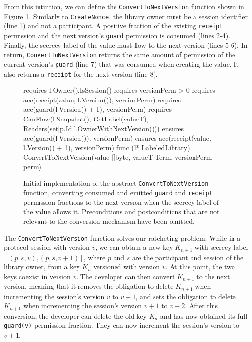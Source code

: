 From this intuition, we can define the \texttt{ConvertToNextVersion} function shown in Figure \ref{lst:convert-to-next-version}.
Similarly to \texttt{CreateNonce}, the library owner must be a session identifier (line 1) and not a participant. A positive fraction of the existing \texttt{receipt} permission and the next version's \texttt{guard} permission is consumed (lines 2-4). Finally, the secrecy label of the value must flow to the next version (lines 5-6).
In return, \texttt{ConvertToNextVersion} returns the same amount of permission of the current version's \texttt{guard} (line 7) that was consumed when creating the value. It also returns a \texttt{receipt} for the next version (line 8).

\begin{figure}
    \begin{gobra}
requires l.Owner().IsSession()
requires versionPerm > 0
requires acc(receipt(value, l.Version()), versionPerm)
requires acc(guard(l.Version() + 1), versionPerm)
requires CanFlow(l.Snapshot(), GetLabel(valueT),
    Readers(set[p.Id]{l.OwnerWithNextVersion()}))
ensures  acc(guard(l.Version()), versionPerm)
ensures  acc(receipt(value, l.Version() + 1), versionPerm)
func (l* LabeledLibrary) ConvertToNextVersion(value []byte,
    valueT Term, versionPerm perm)
    \end{gobra}
    \caption{Initial implementation of the abstract \texttt{ConvertToNextVersion} function, converting consumed and emitted \texttt{guard} and \texttt{receipt} permission fractions to the next version when the secrecy label of the value allows it. Preconditions and postconditions that are not relevant to the conversion mechanism have been omitted.}
    \label{lst:convert-to-next-version}
\end{figure}

The \texttt{ConvertToNextVersion} function solves our ratcheting problem. While in a protocol session with version $v$, we can obtain a new key $K_{n+1}$ with secrecy label $[(p,s,v), (p,s,v+1)]$, where $p$ and $s$ are the participant and session of the library owner, from a key $K_n$ versioned with version $v$. At this point, the two keys coexist in version $v$. The developer can then convert $K_{n+1}$ to the next version, meaning that it removes the obligation to delete $K_{n+1}$ when incrementing the session's version $v$ to $v+1$, and sets the obligation to delete $K_{n+1}$ when incrementing the session's version $v+1$ to $v+2$. After this conversion, the developer can delete the old key $K_n$ and has now obtained its full \texttt{guard(v)} permission fraction. They can now increment the session's version to $v+1$.

